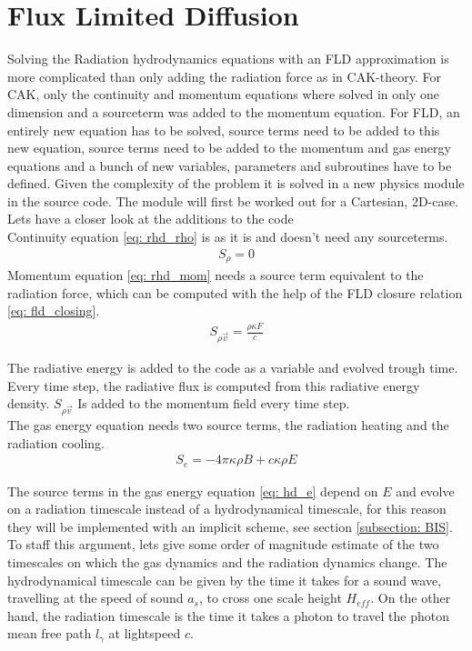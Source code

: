 \section{Flux Limited Diffusion} \label{section: m: FLD}
Solving the Radiation hydrodynamics equations with an FLD approximation is more complicated than only adding the radiation force as in CAK-theory. For CAK, only the continuity and momentum equations where solved in only one dimension and a sourceterm was added to the momentum equation. For FLD, an entirely new equation has to be solved, source terms need to be added to this new equation, source terms need to be added to the momentum and gas energy equations and a bunch of new variables, parameters and subroutines have to be defined. Given the complexity of the problem it is solved in a new physics module in the source code. The module will first be worked out for a Cartesian, 2D-case. Lets have a closer look at the additions to the code \\

Continuity equation \eqref{eq: rhd_rho} is as it is and doesn't need any sourceterms.
\begin{align}
S_{\rho} = 0
\end{align}
Momentum equation \eqref{eq: rhd_mom} needs a source term equivalent to the radiation force, which can be computed with the help of the FLD closure relation \eqref{eq: fld_closing}. 
\begin{align}
S_{\rho \vec{v}} = \frac{\rho \kappa F}{c}
\end{align}

The radiative energy is added to the code as a variable and evolved trough time. Every time step, the radiative flux is computed from this radiative energy density. $S_{\rho \vec{v}}$ Is added to the momentum field every time step.\\

The gas energy equation needs two source terms, the radiation heating and the radiation cooling. 
\begin{align}
S_{e} = -4\pi \kappa \rho B + c \kappa \rho E 
\end{align}

The source terms in the gas energy equation \eqref{eq: hd_e} depend on $E$ and evolve on a radiation timescale instead of a hydrodynamical timescale, for this reason they will be implemented with an implicit scheme, see section \ref{subsection: BIS}. To staff this argument, lets give some order of magnitude estimate of the two timescales on which the gas dynamics and the radiation dynamics change. The hydrodynamical timescale can be given by the time it takes for a sound wave, travelling at the speed of sound $a_s$, to cross one scale height $H_{eff}$. On the other hand, the radiation timescale is the time it takes a photon to travel the photon mean free path $l_\gamma$ at lightspeed $c$.


